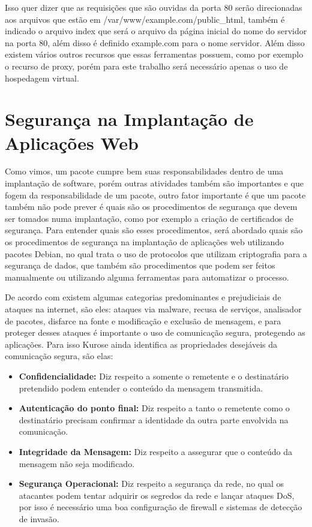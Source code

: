Isso quer dizer que as requisições que são ouvidas da porta 80 serão direcionadas
aos arquivos que estão em /var/www/example.com/public\_html, também é indicado o
arquivo index que será o arquivo da página inicial do nome do servidor na porta 80,
além disso é definido example.com para o nome servidor. Além disso existem vários
outros recursos que essas ferramentas possuem, como por exemplo o recurso de proxy,
porém para este trabalho será necessário apenas o uso de hospedagem virtual.

\section{Segurança na Implantação de Aplicações Web}
\label{sec:seguranca}

Como vimos, um pacote cumpre bem suas responsabilidades dentro de uma implantação de
software, porém outras atividades também são importantes e que fogem da responsabilidade
de um pacote, outro fator importante é que um pacote também não pode prever é quais são
os procedimentos de segurança que devem ser tomados numa implantação, como por exemplo a criação de certificados de
segurança. Para entender quais são esses procedimentos, será abordado quais são
os procedimentos de segurança na implantação de aplicações web utilizando
pacotes Debian, no qual trata o uso de protocolos que utilizam criptografia para a segurança de dados,
que também são procedimentos que podem ser feitos manualmente ou utilizando alguma
ferramentas para automatizar o processo.

De acordo com \cite{kurose2010redes} existem algumas categorias predominantes e prejudiciais
de ataques na internet, são eles: ataques via malware, recusa de serviços, analisador
de pacotes, disfarce na fonte e modificação e exclusão de mensagem, e para proteger
desses ataques é importante o uso de comunicação segura, protegendo as aplicações. Para
isso Kurose ainda identifica as propriedades desejáveis da comunicação segura, são elas:

\begin{itemize}
  \item \textbf{Confidencialidade:} Diz respeito a somente o remetente e o destinatário
  pretendido podem entender o conteúdo da mensagem transmitida.
  \item \textbf{Autenticação do ponto final:} Diz respeito a tanto o remetente como o destinatário
  precisam confirmar a identidade da outra parte envolvida na comunicação.
  \item \textbf{Integridade da Mensagem:} Diz respeito a assegurar que o conteúdo
  da mensagem não seja modificado.
  \item \textbf{Segurança Operacional:} Diz respeito a segurança da rede, no qual
  os atacantes podem tentar adquirir os segredos da rede e lançar ataques DoS,
  por isso é necessário uma boa configuração de firewall e sistemas de detecção
  de invasão.
\end{itemize}

